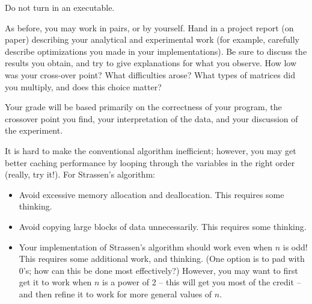 \documentclass[11pt]{article}
\begin{document}
Do not turn in an executable.


As before, you may work in pairs, or by yourself.  Hand in a project
report (on paper) describing your analytical and experimental work
(for example, carefully describe optimizations you made in your
implementations).  Be sure to discuss the results you obtain, and try
to give explanations for what you observe.  How low was your
cross-over point?  What difficulties arose?  What types of matrices did you
multiply, and does this choice matter?

Your grade will be based primarily on the correctness of your program,
the crossover point you find, your interpretation of the
data, and your discussion of the experiment.


It is hard to make the conventional algorithm inefficient; however,
you may get better caching performance by looping through the
variables in the right order (really, try it!).  For Strassen's algorithm:
\begin{itemize}
\item Avoid excessive memory allocation and deallocation.  This requires
some thinking.
\item Avoid copying large blocks of data unnecessarily.   This requires
some thinking.
\item Your implementation of Strassen's algorithm should
work even when $n$ is odd!  This requires some additional work, and thinking.
(One option is to pad with 0's;  how can this be done most effectively?)
However, you may want to first get it to work when $n$ is a power of 2 --
this will get you most of the credit -- and then refine it to work for
more general values of $n$.  
\end{itemize}
\end{document}
